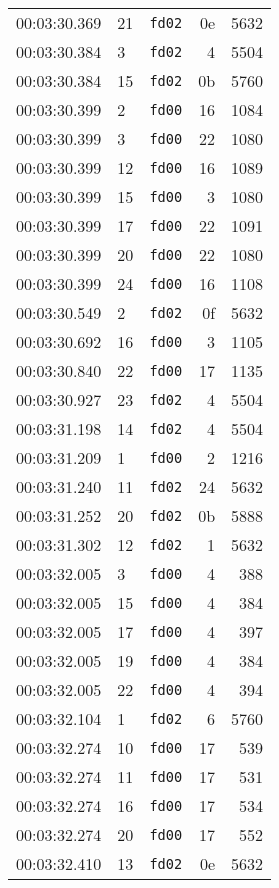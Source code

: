 \documentclass{article}
\begin{document}
\begin{longtable}{lllrr}
00:03:30.369 & 21 & \texttt{fd02} & 0e & 5632 \\
00:03:30.384 & 3 & \texttt{fd02} & 4 & 5504 \\
00:03:30.384 & 15 & \texttt{fd02} & 0b & 5760 \\
00:03:30.399 & 2 & \texttt{fd00} & 16 & 1084 \\
00:03:30.399 & 3 & \texttt{fd00} & 22 & 1080 \\
00:03:30.399 & 12 & \texttt{fd00} & 16 & 1089 \\
00:03:30.399 & 15 & \texttt{fd00} & 3 & 1080 \\
00:03:30.399 & 17 & \texttt{fd00} & 22 & 1091 \\
00:03:30.399 & 20 & \texttt{fd00} & 22 & 1080 \\
00:03:30.399 & 24 & \texttt{fd00} & 16 & 1108 \\
00:03:30.549 & 2 & \texttt{fd02} & 0f & 5632 \\
00:03:30.692 & 16 & \texttt{fd00} & 3 & 1105 \\
00:03:30.840 & 22 & \texttt{fd00} & 17 & 1135 \\
00:03:30.927 & 23 & \texttt{fd02} & 4 & 5504 \\
00:03:31.198 & 14 & \texttt{fd02} & 4 & 5504 \\
00:03:31.209 & 1 & \texttt{fd00} & 2 & 1216 \\
00:03:31.240 & 11 & \texttt{fd02} & 24 & 5632 \\
00:03:31.252 & 20 & \texttt{fd02} & 0b & 5888 \\
00:03:31.302 & 12 & \texttt{fd02} & 1 & 5632 \\
00:03:32.005 & 3 & \texttt{fd00} & 4 & 388 \\
00:03:32.005 & 15 & \texttt{fd00} & 4 & 384 \\
00:03:32.005 & 17 & \texttt{fd00} & 4 & 397 \\
00:03:32.005 & 19 & \texttt{fd00} & 4 & 384 \\
00:03:32.005 & 22 & \texttt{fd00} & 4 & 394 \\
00:03:32.104 & 1 & \texttt{fd02} & 6 & 5760 \\
00:03:32.274 & 10 & \texttt{fd00} & 17 & 539 \\
00:03:32.274 & 11 & \texttt{fd00} & 17 & 531 \\
00:03:32.274 & 16 & \texttt{fd00} & 17 & 534 \\
00:03:32.274 & 20 & \texttt{fd00} & 17 & 552 \\
00:03:32.410 & 13 & \texttt{fd02} & 0e & 5632 \\

\end{longtable}
\end{document}
